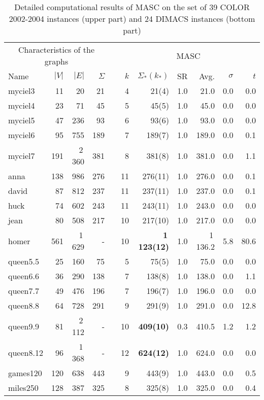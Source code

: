 \documentclass{elsart}
\begin{document}
\renewcommand{\baselinestretch}{0.7}\large\normalsize
\begin{table}\begin{scriptsize}
\caption{Detailed computational results of MASC on the set of 39 COLOR 2002-2004 instances (upper part) and 24 DIMACS instances (bottom part)}
\label{table_MASC}
\begin{tabular}{lrrrcrrrrrr}
\hline
\multicolumn{4}{c}{Characteristics of the graphs} && \multicolumn{6}{c}{MASC}\\
\cline{1-4}\cline{6-11}
Name & $|V|$ & $|E|$ & $\Sigma$ && $k$ & $\Sigma_*(k_*)$ &SR& Avg. & $\sigma$ & $t$ \\
\hline
myciel3    & 11 & 20   & 21 &&4& 21(4)  &1.0& 21.0&0.0 & 0.0  \\
myciel4    & 23 & 71  & 45  &&5& 45(5)  &1.0& 45.0&0.0 & 0.0   \\
myciel5    & 47 & 236 &  93 &&6&  93(6)  &1.0& 93.0&0.0 & 0.0 \\
myciel6    & 95 & 755  &   189 &&7&   189(7)  &1.0& 189.0&0.0 & 0.1  \\
myciel7    & 191 & 2\,360  & 381  &&8& 381(8)  &1.0& 381.0&0.0 & 1.1\\
anna    & 138 & 986  & 276 &&11& 276(11)  &1.0& 276.0&0.0 &0.1  \\
david    & 87 & 812  & 237 &&11& 237(11)  &1.0& 237.0&0.0 & 0.1\\
huck    & 74 & 602   & 243 &&11& 243(11)  &1.0& 243.0&0.0 & 0.0\\
jean    & 80 & 508  & 217 &&10& 217(10)  &1.0& 217.0&0.0 &0.0 \\
homer    & 561 & 1\,629  & -  &&10 & \textbf{1\,123(12)}  &1.0 & 1\,136.2&5.8  &80.6 \\
queen5.5    & 25 & 160  & 75    &&5& 75(5)  &1.0& 75.0&0.0 & 0.0  \\
queen6.6    & 36 & 290  & 138 &&7& 138(8) &1.0& 138.0&0.0 & 1.1  \\
queen7.7    & 49 & 476 &  196 &&7&  196(7) &1.0& 196.0&0.0 & 0.0 \\
queen8.8    & 64 & 728 & 291 &&9& 291(9) &1.0& 291.0&0.0 & 12.8   \\
queen9.9    & 81 & 2\,112 & -  &&10& \textbf{409(10)} &0.3 & 410.5&1.2  & 1.2   \\
queen8.12    & 96 & 1\,368 & -  &&12& \textbf{624(12)} &1.0& 624.0&0.0 & 0.0   \\
games120    & 120 & 638 & 443  &&9& 443(9) &1.0& 443.0&0.0 & 0.5\\
miles250    & 128 & 387  & 325  &&8& 325(8) &1.0& 325.0&0.0 & 0.4 \\

\end{tabular}
\end{scriptsize}
\end{table}
\end{document}
